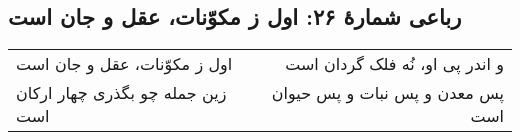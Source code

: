 \begin{center}
\section*{رباعی شمارهٔ ۲۶: اول ز مکوّنات، عقل و جان است}
\label{sec:026}
\begin{longtable}{l p{0.5cm} r}
اول ز مکوّنات، عقل و جان است
&&
و اندر پی او، نُه فلک گردان است
\\
زین جمله چو بگذری چهار ارکان است
&&
پس معدن و پس نبات و پس حیوان است
\\
\end{longtable}
\end{center}
